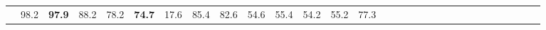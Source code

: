 \documentclass{article}
\begin{document}
\begin{table*}[]
\begin{tabular}{cc|cccccccccccccccccccccccccccc}
\hspace{-0.4em} & \hspace{-0.9em}98.2\hspace{-0.4em} & \hspace{-0.9em}\textbf{97.9}\hspace{-0.4em} & \hspace{-0.9em}88.2\hspace{-0.4em} & \hspace{-0.9em}78.2\hspace{-0.4em} & \hspace{-0.9em}\textbf{74.7}\hspace{-0.4em} & \hspace{-0.9em}17.6\hspace{-0.4em} & \hspace{-0.9em}85.4\hspace{-0.4em} & \hspace{-0.9em}82.6\hspace{-0.4em} & \hspace{-0.9em}54.6\hspace{-0.4em} & \hspace{-0.9em}55.4\hspace{-0.4em} & \hspace{-0.9em}54.2\hspace{-0.4em} & \hspace{-0.9em}55.2\hspace{-0.4em} & \hspace{-0.9em}77.3\hspace{-0.4em} 
        \\

\end{tabular}
\end{table*}
\end{document}
